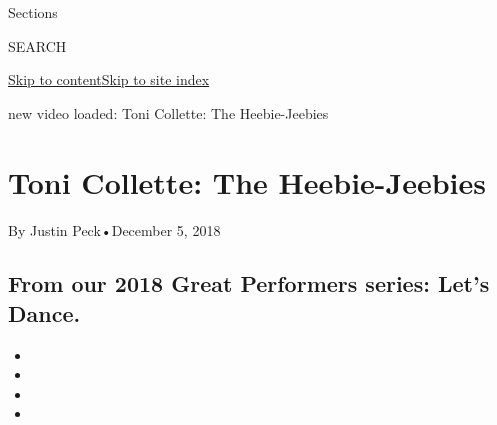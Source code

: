 Sections

SEARCH

\protect\hyperlink{site-content}{Skip to
content}\protect\hyperlink{site-index}{Skip to site index}

new video loaded: Toni Collette: The Heebie-Jeebies

\hypertarget{toni-collette-the-heebie-jeebies}{%
\section{Toni Collette: The
Heebie-Jeebies}\label{toni-collette-the-heebie-jeebies}}

By Justin Peck•December 5, 2018

\hypertarget{from-our-2018-great-performers-series-lets-dance}{%
\subsection{From our 2018 Great Performers series: Let's
Dance.}\label{from-our-2018-great-performers-series-lets-dance}}

\begin{itemize}
\item
\item
\item
\item
\end{itemize}

